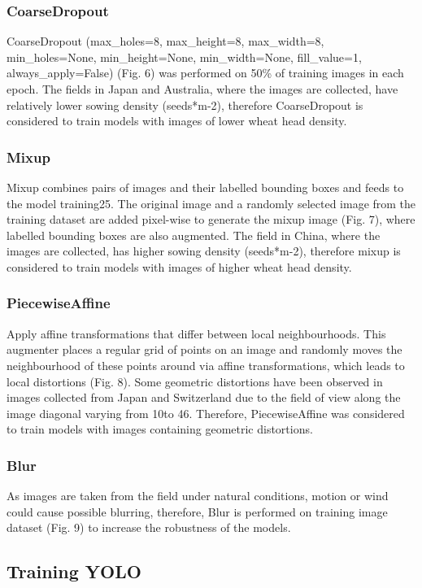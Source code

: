 \documentclass[utf8]{frontiersSCNS} %
\begin{document}
\subsubsection{CoarseDropout}
CoarseDropout (max\_holes=8, max\_height=8, max\_width=8, min\_holes=None, min\_height=None, min\_width=None, fill\_value=1, always\_apply=False) (Fig. 6) was performed on 50\% of training images in each epoch. The fields in Japan and Australia, where the images are collected, have relatively lower sowing density (seeds*m-2), therefore CoarseDropout is considered to train models with images of lower wheat head density.

\subsubsection{Mixup}
Mixup combines pairs of images and their labelled bounding boxes and feeds to the model training25. The original image and a randomly selected image from the training dataset are added pixel-wise to generate the mixup image (Fig. 7), where labelled bounding boxes are also augmented. The field in China, where the images are collected, has higher sowing density (seeds*m-2), therefore mixup is considered to train models with images of higher wheat head density.  

\subsubsection{PiecewiseAffine}
Apply affine transformations that differ between local neighbourhoods. This augmenter places a regular grid of points on an image and randomly moves the neighbourhood of these points around via affine transformations, which leads to local distortions (Fig. 8). Some geometric distortions have been observed in images collected from Japan and Switzerland due to the field of view along the image diagonal varying from 10\degree \space to 46\degree. Therefore, PiecewiseAffine was considered to train models with images containing geometric distortions.

\subsubsection{Blur}
As images are taken from the field under natural conditions, motion or wind could cause possible blurring, therefore, Blur is performed on training image dataset (Fig. 9) to increase the robustness of the models.

\subsection{Training YOLO}
\end{document}
